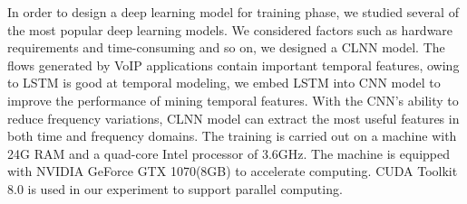 \documentclass[conference]{IEEEtran}
\begin{document}

In order to design a deep learning model for training phase, we studied several of the most popular deep learning models. We considered factors such as hardware requirements and time-consuming and so on, we designed a CLNN model. The flows generated by VoIP applications contain important temporal features, owing to LSTM is good at temporal modeling, we embed LSTM into CNN model to improve the performance of mining temporal features. With the CNN's ability to reduce frequency variations, CLNN model can extract the most useful features in both time and frequency domains. The training is carried out on a machine with 24G RAM and a quad-core Intel processor of 3.6GHz. The machine is equipped with NVIDIA GeForce GTX 1070(8GB) to accelerate computing. CUDA Toolkit 8.0 is used in our experiment to support parallel computing.

\end{document}
